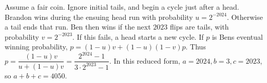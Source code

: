 Assume a fair coin. Ignore initial tails, and begin a cycle just after a head. Brandon wins during the ensuing head run with probability $u=2^{-2024}$. Otherwise a tail ends that run. Ben then wins if the next $2023$ flips are tails, with probability $v=2^{-2023}$. If this fails, a head starts a new cycle. If $p$ is Ben\textquotesingle s eventual winning probability, $p=(1-u)v+(1-u)(1-v)p$. Thus $p=\dfrac{(1-u)v}{u+(1-u)v}=\dfrac{2^{2024}-1}{3\cdot2^{2023}-1}$. In this reduced form, $a=2024,b=3,c=2023$, so $\boxed{a+b+c=4050}$.
